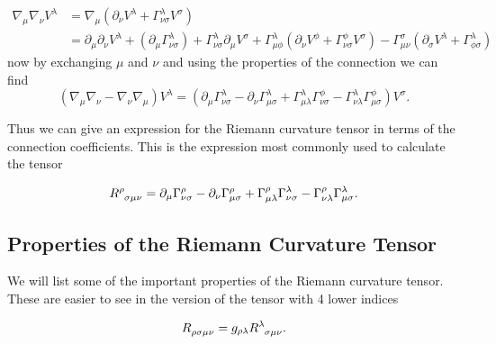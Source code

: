 \begin{equation} \label{riemann-deriv}
	\begin{aligned}
		\nabla_{\mu} \nabla_{\nu} V^{\lambda} &= \nabla_{\mu} (\partial_{\nu} V^{\lambda} + \Gamma^{\lambda}_{\nu \sigma} V^{\sigma}) \\
		&= \partial_{\mu} \partial_{\nu} V^{\lambda} + (\partial_{\mu} \Gamma^{\lambda}_{\nu \sigma}) + \Gamma^{\lambda}_{\nu \sigma} \partial_{\mu} V^{\sigma}
		+ \Gamma^{\lambda}_{\mu \phi} (\partial_{\nu} V^{\phi} + \Gamma^{\phi}_{\nu \sigma} V^{\sigma}) - \Gamma^{\sigma}_{\mu \nu} (\partial_{\sigma} V^{\lambda}
		+ \Gamma^{\lambda}_{\phi \sigma})
	\end{aligned}
\end{equation}
now by exchanging \(\mu\) and \(\nu\) and using the properties of the connection we can find
\begin{equation} \label{riemann-deriv2}
	(\nabla_{\mu} \nabla_{\nu} - \nabla_{\nu} \nabla_{\mu}) V^{\lambda} = (\partial_{\mu} \Gamma^{\lambda}_{\nu \sigma} - \partial_{\nu}\Gamma^{\lambda}_{\mu \sigma} 
	+ \Gamma^{\lambda}_{\mu \lambda} \Gamma^{\phi}_{\nu \sigma} - \Gamma^{\lambda}_{\nu \lambda} \Gamma^{\phi}_{\mu \sigma}) V^{\sigma} .
\end{equation}

Thus we can give an expression for the Riemann curvature tensor in terms of the connection coefficients. This is the expression most commonly used to calculate the tensor 

\begin{equation} \label{riemann-christoffel}
	R\indices{^\rho_\sigma_\mu_\nu} = \partial_{\mu} \Gamma^{\rho}_{\nu \sigma} - \partial_{\nu}\Gamma^{\rho}_{\mu \sigma} 
	+ \Gamma^{\rho}_{\mu \lambda} \Gamma^{\lambda}_{\nu \sigma} - \Gamma^{\rho}_{\nu \lambda} \Gamma^{\lambda}_{\mu \sigma} .
\end{equation}

\subsection{Properties of the Riemann Curvature Tensor}

We will list some of the important properties of the Riemann curvature tensor. These are easier to see in the version of the tensor with 4 lower indices 

\begin{equation} \label{riemann-lower}
	R\indices{_\rho_\sigma_\mu_\nu} = g_{\rho \lambda} R\indices{^\lambda_\sigma_\mu_\nu} .
\end{equation}

